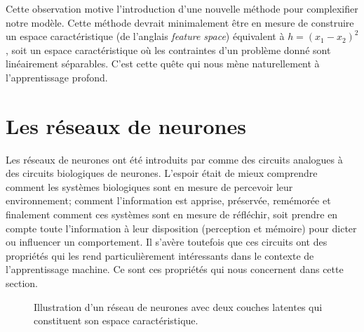 Cette observation motive l'introduction d'une nouvelle méthode pour complexifier notre modèle. 
Cette méthode devrait minimalement être en mesure de construire un espace caractéristique (de l'anglais \textit{feature space}) 
équivalent à $h = (x_1 - x_2)^2$, soit un espace caractéristique où les contraintes d'un problème donné sont linéairement séparables.
C'est cette quête qui nous mène naturellement à l'apprentissage profond. 


\section{Les réseaux de neurones}\label{sec:app profond}

Les réseaux de neurones ont été introduits par \citet{Rosenblatt1958} comme des circuits analogues à des circuits biologiques 
de neurones. L'espoir était de mieux comprendre comment les systèmes biologiques sont en mesure de percevoir 
leur environnement; comment l'information est apprise, préservée, remémorée et finalement comment ces systèmes sont 
en mesure de réfléchir, soit prendre en compte toute l'information à leur disposition (perception et mémoire) 
pour dicter ou influencer un comportement. Il s'avère toutefois que ces circuits ont des propriétés qui les rend 
particulièrement intéressants dans le contexte de l'apprentissage machine. 
Ce sont ces propriétés qui nous concernent dans cette section.

\begin{figure}[H]
 \centering
{}
\caption{Illustration d'un réseau de neurones avec deux couches latentes qui constituent son espace caractéristique.}
\label{fig:mlp}
\end{figure}

